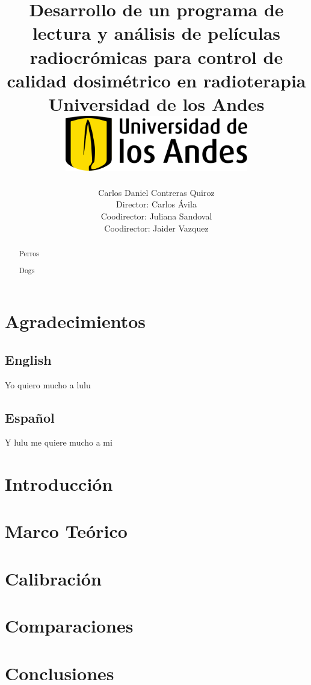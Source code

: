 \documentclass[12pt]{report}
\title 
{
	{Desarrollo de un programa de lectura y análisis de películas radiocrómicas para control de calidad dosimétrico en radioterapia}\\
	{\large Universidad de los Andes}\\
	\vspace{1.5cm}
	{\includegraphics[width = 0.6\textwidth]{logo.png}}	
}
\author{Carlos Daniel Contreras Quiroz\\[1cm]{\small Director: Carlos \'Avila}\\[1cm]{\small Coodirector: Juliana Sandoval}\\[1cm]{\small Coodirector: Jaider Vazquez}}
\newenvironment{dedication}
  {\clearpage           %
   \thispagestyle{empty}%
   \vspace*{\stretch{1}}%
   \raggedleft          %
  }
  {\par %
   \vspace{\stretch{3}} %
   \clearpage           %
  }
\theoremstyle{definition}
\begin{document}

\maketitle


\begin{abstract}

Perros

\end{abstract}

\begin{otherlanguage}{spanish}
\begin{abstract}

Dogs

\end{abstract}
\end{otherlanguage}

\newpage

\chapter*{Agradecimientos}

\section*{English}

Yo quiero mucho a lulu

\section*{Español}

Y lulu me quiere mucho a mi

\tableofcontents

\listoffigures

\chapter{Introducción}


\chapter{Marco Teórico}\label{chp:teorico}


\chapter{Calibración}\label{chp:Calibracion}


\chapter{Comparaciones}\label{chp:comparaciones}



\chapter{Conclusiones}




\end{document}
